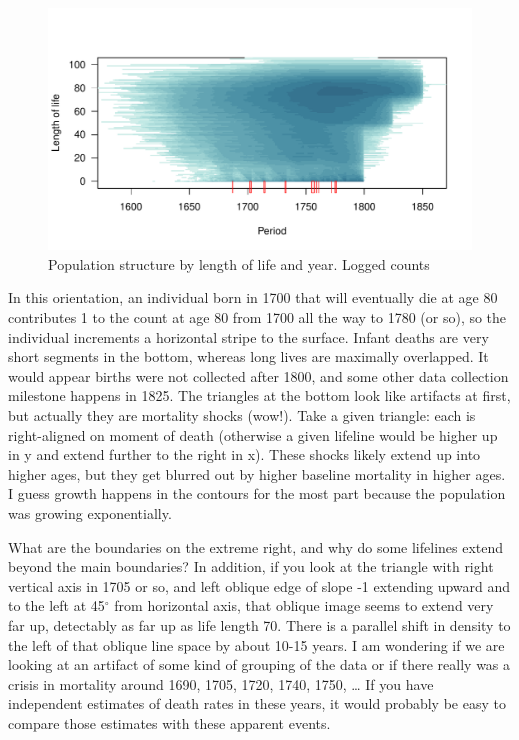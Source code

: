 \begin{figure}
\centering
\includegraphics[scale=.9]{Figures/QuebecLP.pdf}
\caption{Population structure by length of life and year. Logged counts}
\label{fig:lpq}
\end{figure}
In this orientation, an individual born in 1700 that will eventually die at age
80 contributes 1 to the count at age 80 from 1700 all the way to 1780 (or so), so the individual increments a horizontal stripe to the surface. Infant deaths are very short segments in the bottom, whereas long lives are maximally overlapped. It would appear births were not collected after 1800, and some other data collection milestone happens in 1825. The triangles at the bottom look like artifacts at first, but actually they are mortality shocks (wow!). Take a given triangle: each is right-aligned on moment of death (otherwise a given lifeline would be higher up in y and extend further to the right in x). These shocks likely extend up into higher ages, but they get blurred out by higher baseline mortality in higher ages. I guess growth happens in the contours for the most part because the population was growing exponentially.

What are the boundaries on the extreme right, and why do some lifelines extend
beyond the main boundaries?  In addition, if you look at the triangle with right
vertical axis in 1705 or so, and left oblique edge of slope -1 extending upward
and to the left at 45$^\circ$ from horizontal axis, that oblique image seems to
extend very far up, detectably as far up as life length 70.  There is a parallel shift in density to the left of that oblique line space by about 10-15 years.  I am wondering if we are looking at an artifact of some kind of grouping of the data or if there really was a crisis in mortality around 1690, 1705, 1720, 1740, 1750, …  If you have independent estimates of death rates in these years, it would probably be easy to compare those estimates with these apparent events.

